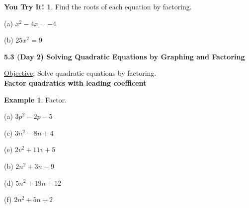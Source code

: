 \documentclass{report}
\theoremstyle{definition}
\newtheorem{example}{\bf Example}
\newtheorem{youtry}{\textbf{You Try It!}}
\begin{document}
\begin{youtry}
Find the roots of each equation by factoring.
\end{youtry}

\begin{minipage}[t]{0.45\linewidth}
(a) $x^2-4x=-4$
\vspace{3cm}
\end{minipage}
\hfill
\begin{minipage}[t]{0.45\linewidth}
(b) $25x^2=9$
\vspace{3cm}
\end{minipage}


\vspace{2cm}

\vfill
 \noindent{}

 \newpage

\noindent\Large{\textbf{5.3 (Day 2) Solving Quadratic Equations by Graphing and Factoring}}\normalsize\\

\vspace{-0.5cm}

 \hfill \underline{Objective}: Solve quadratic equations by factoring. \\

\noindent\textbf{Factor quadratics with leading coefficent}

\begin{example}
Factor.
\end{example}

\begin{minipage}[t]{0.45\linewidth}
(a) $3p^2-2p-5$
\vspace{4cm}

(c) $3n^2-8n+4$
\vspace{3cm}

(e) $2v^2+11v+5$
\end{minipage}
\hfill
\begin{minipage}[t]{0.45\linewidth}
(b) $2n^2+3n-9$
\vspace{4cm}

(d) $5n^2+19n+12$
\vspace{3cm}

(f) $2n^2+5n+2$
\end{minipage}
\vspace{3cm}
\end{document}
